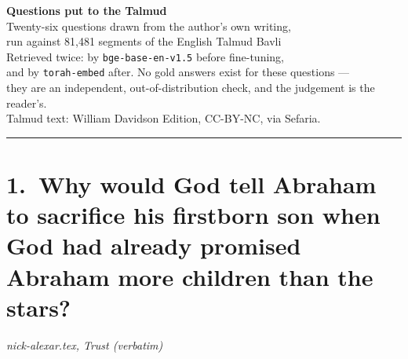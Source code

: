 \documentclass[11pt,a4paper]{article}
\begin{document}
\begin{center}
{\LARGE\bfseries Questions put to the Talmud}\\[6pt]
{\color{quiet}\normalsize Twenty-six questions drawn from the author's own writing,\\
run against 81,481 segments of the English Talmud Bavli}\\[6pt]
{\color{quiet}\small Retrieved twice: by \texttt{bge-base-en-v1.5} before fine-tuning,\\
and by \texttt{torah-embed} after. No gold answers exist for these questions ---\\
they are an independent, out-of-distribution check, and the judgement is the reader's.}\\[4pt]
{\color{quiet}\small Talmud text: William Davidson Edition, CC-BY-NC, via Sefaria.}
\end{center}
\vspace{8pt}\hrule\vspace{4pt}
\section*{1.\ Why would God tell Abraham to sacrifice his firstborn son when God had already promised Abraham more children than the stars?}
{\color{quiet}\small\textit{nick-alexar.tex, Trust (verbatim)}}
\end{document}
